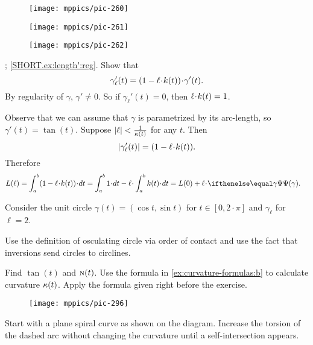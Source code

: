 \begin{figure}[h!]
\begin{minipage}{.32\textwidth}
\centering
\texttt{[image: mppics/pic-260]}
\end{minipage}\hfill
\begin{minipage}{.32\textwidth}
\centering
\texttt{[image: mppics/pic-261]}
\end{minipage}
\hfill
\begin{minipage}{.32\textwidth}
\centering
\texttt{[image: mppics/pic-262]}
\end{minipage}
\end{figure}

\parbf{\ref{ex:length'}}; \ref{SHORT.ex:length':reg}.
Show that
\[
\gamma_\ell'(t)=(1-\ell\cdot\skur(t))\cdot \gamma'(t).
\]
By regularity of $\gamma$, $\gamma'\ne0$.
So if $\gamma_\ell'(t)=0$, then $\ell\cdot \skur(t)= 1$.

 Observe that we can assume that $\gamma$ is parametrized by its arc-length, so $\gamma'(t)=\tan(t)$.
Suppose $|\ell|<\frac{1}{\kappa(t)}$ for any $t$.
Then 
\[
|\gamma_\ell'(t)|=(1-\ell\cdot\skur(t)).
\]
Therefore
\begin{align*}
L(\ell)
&=
\int_a^b(1-\ell\cdot\skur(t))\cdot dt=
\int_a^b 1\cdot dt-\ell\cdot \int_a^b\skur(t)\cdot dt=
L(0)+\ell\cdot\tgc\gamma.
\end{align*}



Consider the unit circle $\gamma(t)=(\cos t,\sin t)$ for $t\in[0,2\cdot\pi]$ and $\gamma_\ell$ for $\ell=2$.

Use the definition of osculating circle via order of contact and use the fact that inversions send circles to circlines. 

Find $\tan(t)$ and $\text{\sc{n}}(t)$.
Use the formula in \ref{ex:curvature-formulas:b} to calculate curvature $\kappa(t)$.
Apply the formula given right before the exercise.

\begin{wrapfigure}{r}{15 mm}
\vskip-0mm
\centering
\texttt{[image: mppics/pic-296]}
\vskip0mm
\end{wrapfigure}

 Start with a plane spiral curve as shown on the diagram.
Increase the torsion of the dashed arc without changing the curvature until a self-intersection appears.

